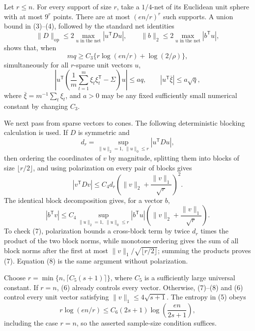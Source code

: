 Let \(r\le n\).  For every support of size \(r\), take a \(1/4\)-net of its Euclidean unit sphere with at most \(9^r\) points.  There are at most \((en/r)^r\) such supports.  A union bound in (3)--(4), followed by the standard net identities
\[
 \lVert D\rVert_{\mathrm{op}}
 \le2\max_{u\text{ in the net}}|u^{\mathsf T}Du|,
 \qquad
 \lVert b\rVert_2
 \le2\max_{u\text{ in the net}}|b^{\mathsf T}u|,
\]
shows that, when
\[
 mq\ge C_3\{r\log(en/r)+\log(2/\rho)\},                              \tag{5}
\]
simultaneously for all \(r\)-sparse unit vectors \(u\),
\[
 \left|u^{\mathsf T}\left(\frac1m\sum_{t=1}^m\xi_t\xi_t^{\mathsf T}-\Sigma\right)u\right|
 \le a q,
 \qquad
 \left|u^{\mathsf T}\bar\xi\right|\le a\sqrt q,                    \tag{6}
\]
where \(\bar\xi=m^{-1}\sum_t\xi_t\), and \(a>0\) may be any fixed sufficiently small numerical constant by changing \(C_3\).

We next pass from sparse vectors to cones.  The following deterministic blocking calculation is used.  If \(D\) is symmetric and
\[
 d_r=\sup_{\lVert u\rVert_2=1,\ \lVert u\rVert_0\le r}|u^{\mathsf T}Du|,
\]
then ordering the coordinates of \(v\) by magnitude, splitting them into blocks of size \(\lfloor r/2\rfloor\), and using polarization on every pair of blocks gives
\[
 |v^{\mathsf T}Dv|
 \le C_4d_r\left(\lVert v\rVert_2+\frac{\lVert v\rVert_1}{\sqrt r}\right)^2.                 \tag{7}
\]
The identical block decomposition gives, for a vector \(b\),
\[
 |b^{\mathsf T}v|
 \le C_4\sup_{\lVert u\rVert_2=1,\ \lVert u\rVert_0\le r}|b^{\mathsf T}u|
 \left(\lVert v\rVert_2+\frac{\lVert v\rVert_1}{\sqrt r}\right).                            \tag{8}
\]
To check (7), polarization bounds a cross-block term by twice \(d_r\) times the product of the two block norms, while monotone ordering gives the sum of all block norms after the first at most \(\lVert v\rVert_1/\sqrt{\lfloor r/2\rfloor}\); summing the products proves (7).  Equation (8) is the same argument without polarization.

Choose \(r=\min\{n,\lceil C_5(s+1)\rceil\}\), where \(C_5\) is a sufficiently large universal constant.  If \(r=n\), (6) already controls every vector.  Otherwise, (7)--(8) and (6) control every unit vector satisfying \(\lVert v\rVert_1\le4\sqrt{s+1}\).  The entropy in (5) obeys
\[
 r\log(en/r)\le C_6(2s+1)\log\!\left(\frac{en}{2s+1}\right),          \tag{9}
\]
including the case \(r=n\), so the asserted sample-size condition suffices.

